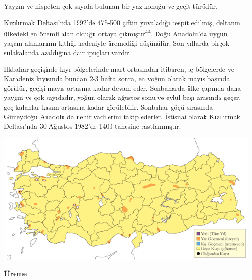 \documentclass[
  letterpaper,
  DIV=11,
  numbers=noendperiod]{scrreprt}
\begin{document}
Yaygın ve nispeten çok sayıda bulunan bir yaz konuğu ve geçit türüdür.

Kızılırmak Deltası'nda 1992'de 475-500 çiftin yuvaladığı tespit edilmiş,
deltanın ülkedeki en önemli alan olduğu ortaya
çıkmıştır\textsuperscript{44}. Doğu Anadolu'da uygun yaşam alanlarının
kıtlığı nedeniyle üremediği düşünülür. Son yıllarda birçok sulakalanda
azaldığına dair ipuçları vardır.

İlkbahar geçişinde kıyı bölgelerinde mart ortasından itibaren, iç
bölgelerde ve Karadeniz kıyısında bundan 2-3 hafta sonra, en yoğun
olarak mayıs başında görülür, geçişi mayıs ortasına kadar devam eder.
Sonbaharda ülke çapında daha yaygın ve çok sayıdadır, yoğun olarak
ağustos sonu ve eylül başı arasında geçer, geç kalanlar kasım ortasına
kadar görülebilir. Sonbahar göçü sırasında Güneydoğu Anadolu'da nehir
vadilerini takip ederler. İstisnai olarak Kızılırmak Deltası'nda 30
Ağustos 1982'de 1400 tanesine rastlanmıştır.

\includegraphics{images/harita_Page_070.png}

\textbf{Üreme}
\end{document}
